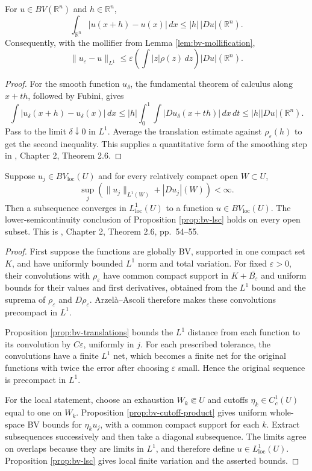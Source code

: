 \begin{proposition}\label{prop:bv-translations}
For $u\in BV(\mathbb R^n)$ and $h\in\mathbb R^n$,
\[
 \int_{\mathbb R^n}|u(x+h)-u(x)|\,dx
 \leq |h|\,|Du|(\mathbb R^n).
\]
Consequently, with the mollifier from Lemma \ref{lem:bv-mollification},
\[
 \|u_\varepsilon-u\|_{L^1}\leq
 \varepsilon\left(\int|z|\rho(z)\,dz\right)|Du|(\mathbb R^n).
\]
\end{proposition}
\begin{proof}
For the smooth function $u_\delta$, the fundamental theorem of calculus along $x+th$, followed by Fubini, gives
\[
 \int|u_\delta(x+h)-u_\delta(x)|\,dx
 \leq|h|\int_0^1\int|Du_\delta(x+th)|\,dx\,dt
 \leq|h||Du|(\mathbb R^n).
\]
Pass to the limit $\delta\downarrow0$ in $L^1$. Average the translation estimate against $\rho_\varepsilon(h)$ to get the second inequality. This supplies a quantitative form of the smoothing step in \cite{Sim18}, Chapter 2, Theorem 2.6.
\end{proof}

\begin{theorem}\label{thm:bv-local-compactness}
Suppose $u_j\in BV_{\mathrm{loc}}(U)$ and for every relatively compact open $W\subset U$,
\[
 \sup_j\left(\|u_j\|_{L^1(W)}+|Du_j|(W)\right)<\infty.
\]
Then a subsequence converges in $L^1_{\mathrm{loc}}(U)$ to a function $u\in BV_{\mathrm{loc}}(U)$. The lower-semicontinuity conclusion of Proposition \ref{prop:bv-lsc} holds on every open subset. This is \cite{Sim18}, Chapter 2, Theorem 2.6, pp.~54--55.
\end{theorem}
\begin{proof}
First suppose the functions are globally BV, supported in one compact set $K$, and have uniformly bounded $L^1$ norm and total variation. For fixed $\varepsilon>0$, their convolutions with $\rho_\varepsilon$ have common compact support in $K+\overline{B_\varepsilon}$ and uniform bounds for their values and first derivatives, obtained from the $L^1$ bound and the suprema of $\rho_\varepsilon$ and $D\rho_\varepsilon$. Arzel\`a--Ascoli therefore makes these convolutions precompact in $L^1$.

Proposition \ref{prop:bv-translations} bounds the $L^1$ distance from each function to its convolution by $C\varepsilon$, uniformly in $j$. For each prescribed tolerance, the convolutions have a finite $L^1$ net, which becomes a finite net for the original functions with twice the error after choosing $\varepsilon$ small. Hence the original sequence is precompact in $L^1$.

For the local statement, choose an exhaustion $W_k\Subset U$ and cutoffs $\eta_k\in C_c^1(U)$ equal to one on $W_k$. Proposition \ref{prop:bv-cutoff-product} gives uniform whole-space BV bounds for $\eta_ku_j$, with a common compact support for each $k$. Extract subsequences successively and then take a diagonal subsequence. The limits agree on overlaps because they are limits in $L^1$, and therefore define $u\in L^1_{\mathrm{loc}}(U)$. Proposition \ref{prop:bv-lsc} gives local finite variation and the asserted bounds.
\end{proof}

